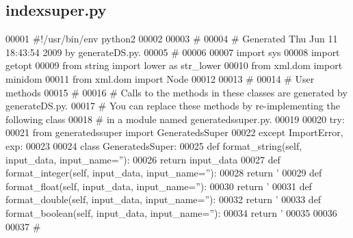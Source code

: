 \subsection{indexsuper.\+py}
\label{indexsuper_8py_source}

\begin{DoxyCode}
00001 \textcolor{comment}{#!/usr/bin/env python2}
00002 
00003 \textcolor{comment}{#}
00004 \textcolor{comment}{# Generated Thu Jun 11 18:43:54 2009 by generateDS.py.}
00005 \textcolor{comment}{#}
00006 
00007 \textcolor{keyword}{import} sys
00008 \textcolor{keyword}{import} getopt
00009 \textcolor{keyword}{from} string \textcolor{keyword}{import} lower \textcolor{keyword}{as} str\_lower
00010 \textcolor{keyword}{from} xml.dom \textcolor{keyword}{import} minidom
00011 \textcolor{keyword}{from} xml.dom \textcolor{keyword}{import} Node
00012 
00013 \textcolor{comment}{#}
00014 \textcolor{comment}{# User methods}
00015 \textcolor{comment}{#}
00016 \textcolor{comment}{# Calls to the methods in these classes are generated by generateDS.py.}
00017 \textcolor{comment}{# You can replace these methods by re-implementing the following class}
00018 \textcolor{comment}{#   in a module named generatedssuper.py.}
00019 
00020 \textcolor{keywordflow}{try}:
00021     \textcolor{keyword}{from} generatedssuper \textcolor{keyword}{import} GeneratedsSuper
00022 \textcolor{keywordflow}{except} ImportError, exp:
00023 
00024     \textcolor{keyword}{class }GeneratedsSuper:
00025         \textcolor{keyword}{def }format_string(self, input\_data, input\_name=''):
00026             \textcolor{keywordflow}{return} input\_data
00027         \textcolor{keyword}{def }format_integer(self, input\_data, input\_name=''):
00028             \textcolor{keywordflow}{return} \textcolor{stringliteral}{'%
00029         \textcolor{keyword}{def }format_float(self, input\_data, input\_name=''):
00030             \textcolor{keywordflow}{return} \textcolor{stringliteral}{'%
00031         \textcolor{keyword}{def }format_double(self, input\_data, input\_name=''):
00032             \textcolor{keywordflow}{return} \textcolor{stringliteral}{'%
00033         \textcolor{keyword}{def }format_boolean(self, input\_data, input\_name=''):
00034             \textcolor{keywordflow}{return} \textcolor{stringliteral}{'%
00035 
00036 
00037 \textcolor{comment}{#}
}}}}
\end{DoxyCode}
